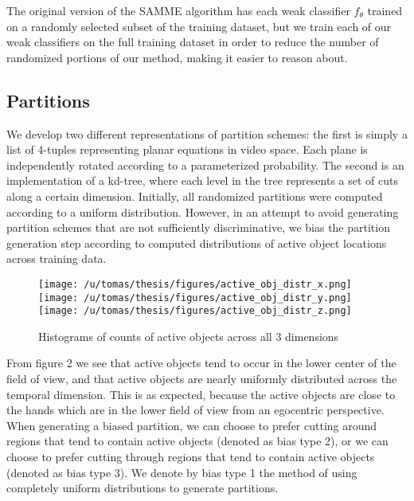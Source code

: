\documentclass[10pt,twocolumn,letterpaper]{article}
\begin{document}
	The original version of the SAMME algorithm has each weak classifier
	$f_\theta$ trained on
	a randomly selected subset of the training dataset, but we train each of
	our weak classifiers on the full training dataset in order to reduce the
	number of randomized portions of our method, making it easier to
	reason about.

\subsection{Partitions}
	We develop two different representations of partition schemes: the first
	is simply a list of 4-tuples representing planar equations in video space.
	Each plane is independently rotated according to a parameterized
	probability.
	The second is an implementation of a kd-tree, where each level in the tree
	represents a set of cuts along a certain dimension.
	Initially, all randomized partitions were computed according to a uniform
	distribution. However, in an attempt to avoid generating partition schemes
	that are not sufficiently discriminative, we bias the partition generation
	step according to computed distributions of active object locations across
	training data. 

	\begin{figure}[t]
		\begin{center}
			  \texttt{[image: /u/tomas/thesis/figures/active\_obj\_distr\_x.png]}
			  \texttt{[image: /u/tomas/thesis/figures/active\_obj\_distr\_y.png]}
			  \texttt{[image: /u/tomas/thesis/figures/active\_obj\_distr\_z.png]}
		\end{center}
		   \caption{Histograms of counts of active objects across all 3 dimensions}
				\label{fig:long}
				\label{fig:onecol}
	\end{figure}
	
	From figure 2 we see that active objects tend to occur in the lower center
	of the field of view, and that active objects are nearly uniformly
	distributed across the temporal dimension. This is as expected, because
	the active objects are close to the hands which are in the lower field of
	view from an egocentric perspective. When generating a biased
	partition, we can choose to prefer cutting around regions that tend to
	contain active objects (denoted as bias type 2), or we can choose to prefer 
	cutting through regions that tend to contain active objects (denoted as bias type 3). 
	We denote by bias type 1 the method of using completely uniform
	distributions to generate partitions.
	
\end{document}
